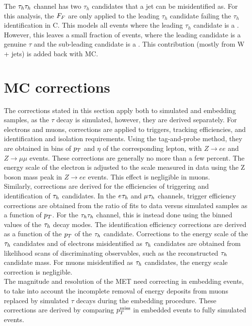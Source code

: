 The $\tau_{h}\tau_{h}$ channel has two $\tau_h$ candidates that a jet can be misidentified as.
For this analysis, the $F_{F}$ are only applied to the leading $\tau_h$ candidate failing the $\tau_h$ identification in C.
This models all events where the leading $\tau_h$ candidate is a \jtth.
However, this leaves a small fraction of events, where the leading candidate is a genuine $\tau$ and the sub-leading candidate is a \jtth.
This contribution (mostly from W + jets) is added back with \ac{MC}.

\section{MC corrections}
\label{sec:ditau_corrections}

The corrections stated in this section apply both to simulated and embedding samples, as the $\tau$ decay is simulated, however, they are derived separately. 
For electrons and muons, corrections are applied to triggers, tracking efficiencies, and identification and isolation requirements.
Using the tag-and-probe method, they are obtained in bins of $p_{T}$ and $\eta$ of the corresponding lepton, with $Z\rightarrow ee$ and $Z\rightarrow\mu\mu$ events. 
These corrections are generally no more than a few percent. 
The energy scale of the electron is adjusted to the scale measured in data using the Z boson mass peak in $Z\rightarrow ee$ events. 
This effect is negligible in muons. \\

Similarly, corrections are derived for the efficiencies of triggering and identification of $\tau_{h}$ candidates. 
In the $e_{}\tau_{h}$ and $\mu_{}\tau_{h}$ channels, trigger efficiency corrections are obtained from the ratio of fits to data versus simulated samples as a function of $p_{T}$. 
For the $\tau_{h}\tau_{h}$ channel, this is instead done using the binned values of the $\tau_{h}$ decay modes.
The identification efficiency corrections are derived as a function of the $p_{T}$ of the $\tau_{h}$ candidate. 
Corrections to the energy scale of the $\tau_{h}$ candidates and of electrons misidentified as $\tau_{h}$ candidates are obtained from likelihood scans of discriminating observables, such as the reconstructed $\tau_{h}$ candidate mass. 
For muons misidentified as $\tau_{h}$ candidates, the energy scale correction is negligible. \\

The magnitude and resolution of the \ac{MET} need correcting in embedding events, to take into account the incomplete removal of energy deposits from muons replaced by simulated $\tau$ decays during the embedding procedure. 
These corrections are derived by comparing $p_{T}^{\text{miss}}$ in embedded events to fully simulated events. \\

